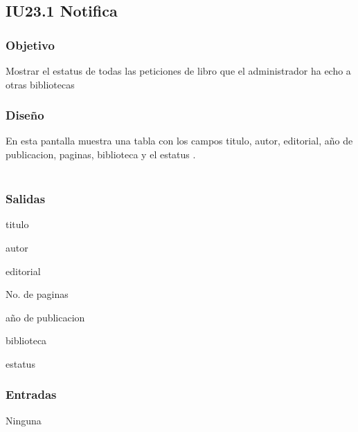 \newpage
\subsection{IU23.1 Notifica}

\subsubsection{Objetivo}
	Mostrar el estatus de todas las peticiones de libro que el administrador ha echo a otras bibliotecas  

\subsubsection{Diseño}
	En esta pantalla muestra una tabla con los campos titulo, autor, editorial, año de publicacion, paginas, biblioteca y el estatus .  \\\\


\subsubsection{Salidas}
	\begin{Citemize}
		\item titulo 
		\item autor
		\item editorial
		\item No. de paginas
		\item año de publicacion
		\item biblioteca
		\item estatus
	\end{Citemize}
	
\subsubsection{Entradas}
	\begin{Citemize}
		\item Ninguna
	\end{Citemize}


